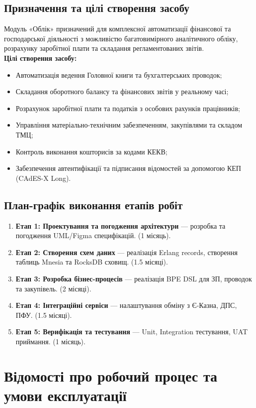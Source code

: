 \documentclass{article}
\begin{document}
\subsection{Призначення та цілі створення засобу}
Модуль «Облік» призначений для комплексної автоматизації фінансової та господарської діяльності з можливістю багатовимірного аналітичного обліку, розрахунку заробітної плати та складання регламентованих звітів.
\\
\textbf{Цілі створення засобу:}
\begin{itemize}
    \item Автоматизація ведення Головної книги та бухгалтерських проводок;
    \item Складання оборотного балансу та фінансових звітів у реальному часі;
    \item Розрахунок заробітної плати та податків з особових рахунків працівників;
    \item Управління матеріально-технічним забезпеченням, закупівлями та складом ТМЦ;
    \item Контроль виконання кошторисів за кодами КЕКВ;
    \item Забезпечення автентифікації та підписання відомостей за допомогою КЕП (CAdES-X Long).
\end{itemize}

\subsection{План-графік виконання етапів робіт}
\begin{enumerate}
    \item \textbf{Етап 1: Проектування та погодження архітектури} --- розробка та погодження UML/Figma специфікацій. (1 місяць).
    \item \textbf{Етап 2: Створення схем даних} --- реалізація Erlang records, створення таблиць Mnesia та RocksDB сховищ. (1.5 місяці).
    \item \textbf{Етап 3: Розробка бізнес-процесів} --- реалізація BPE DSL для ЗП, проводок та закупівель. (2 місяці).
    \item \textbf{Етап 4: Інтеграційні сервіси} --- налаштування обміну з Є-Казна, ДПС, ПФУ. (1.5 місяці).
    \item \textbf{Етап 5: Верифікація та тестування} --- Unit, Integration тестування, UAT приймання. (1 місяць).
\end{enumerate}

\newpage
\section{Відомості про робочий процес та умови експлуатації}
\end{document}
